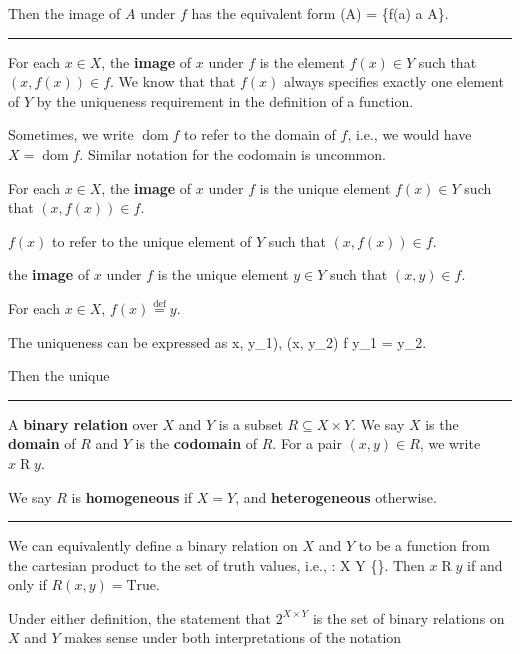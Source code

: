 \documentclass[12pt]{article}
\newcommand{\keyword}[1]{\textbf{#1}}
\def\[#1\]{\begin{align*}#1\end{align*}}
\newcommand{\sepline}{\rule{\textwidth}{0.4pt}}
\theoremstyle{definition}
\newcommand{\defeq}{\overset{\text{def}}{=}}
\newcommand{\<}{\left\langle}
\renewcommand{\>}{\right\rangle}
\DeclareMathOperator{\dom}{dom}
\begin{document}
Then the image of $A$ under $f$ has the equivalent form
\[
    f(A) = \{f(a) \mid a \in A\}.
\]

\sepline


For each $x \in X$, the \keyword{image} of $x$ under $f$ is the element $f(x) \in Y$ such that $(x, f(x)) \in f$. We know that that $f(x)$ always specifies exactly one element of $Y$ by the uniqueness requirement in the definition of a function.



Sometimes, we write $\dom f$ to refer to the domain of $f$, i.e., we would have $X = \dom f$. Similar notation for the codomain is uncommon.

For each $x \in X$, the \keyword{image} of $x$ under $f$ is the unique element $f(x) \in Y$ such that $(x, f(x)) \in f$.

$f(x)$ to refer to the unique element of $Y$ such that $(x, f(x)) \in f$.

the \keyword{image} of $x$ under $f$ is the unique element $y \in Y$ such that $(x, y) \in f$.

For each $x \in X$, $f(x) \defeq y$.

The uniqueness can be expressed as
\[
    (x, y_1), (x, y_2) \in f \implies y_1 = y_2.
\]

Then the unique



\sepline

A \keyword{binary relation} over $X$ and $Y$ is a subset $R \subseteq X \times Y$. We say $X$ is the \keyword{domain} of $R$ and $Y$ is the \keyword{codomain} of $R$. For a pair $(x, y) \in R$, we write $x \mathrel{R} y$.

We say $R$ is \keyword{homogeneous} if $X = Y$, and \keyword{heterogeneous} otherwise.

\sepline

We can equivalently define a binary relation on $X$ and $Y$ to be a function from the cartesian product to the set of truth values, i.e.,
\[
    R : X \times Y \to \{\}.
\]
Then $x \mathrel{R} y$ if and only if $R(x, y) = \text{True}$.

Under either definition, the statement that $2^{X \times Y}$ is the set of binary relations on $X$ and $Y$ makes sense under both interpretations of the notation 
\end{document}
